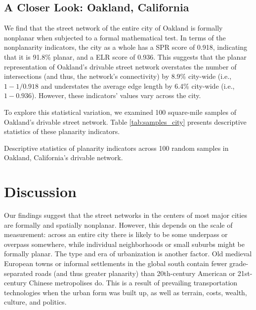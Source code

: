 \documentclass[Afour,sageh,times]{sagej}
\begin{document}
\subsection{A Closer Look: Oakland, California}

We find that the street network of the entire city of Oakland is formally nonplanar when subjected to a formal mathematical test. In terms of the nonplanarity indicators, the city as a whole has a SPR score of 0.918, indicating that it is 91.8\% planar, and a ELR score of 0.936. This suggests that the planar representation of Oakland's drivable street network overstates the number of intersections (and thus, the network's connectivity) by 8.9\% city-wide (i.e., $1 - 1 / 0.918$ and understates the average edge length by 6.4\% city-wide (i.e., $1 - 0.936$). However, these indicators' values vary across the city.

To explore this statistical variation, we examined 100 square-mile samples of Oakland's drivable street network. Table \ref{tab:samples_city} presents descriptive statistics of these planarity indicators. 



\begin{table}[htbp]
\centering
\caption{Descriptive statistics of planarity indicators across 100 random samples in Oakland, California's drivable network.}
\label{tab:samples_city}

\end{table}






\section{Discussion}

Our findings suggest that the street networks in the centers of most major cities are formally and spatially nonplanar. However, this depends on the scale of measurement: across an entire city there is likely to be some underpass or overpass somewhere, while individual neighborhoods or small suburbs might be formally planar. The type and era of urbanization is another factor. Old medieval European towns or informal settlements in the global south contain fewer grade-separated roads (and thus greater planarity) than 20th-century American or 21st-century Chinese metropolises do. This is a result of prevailing transportation technologies when the urban form was built up, as well as terrain, costs, wealth, culture, and politics.
\end{document}
